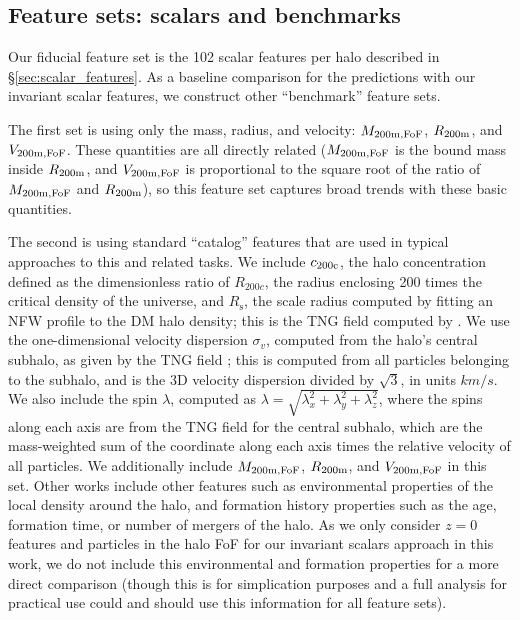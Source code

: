\subsection{Feature sets: scalars and benchmarks}
\label{sec:benchmarks}

Our fiducial feature set is the 102 scalar features per halo described in \S\ref{sec:scalar_features}.
As a baseline comparison for the predictions with our invariant scalar features, we construct other ``benchmark'' feature sets.

The first set is using only the mass, radius, and velocity: $M_\mathrm{200m,FoF}$, $R_\mathrm{200m}$, and $V_\mathrm{200m,FoF}$. 
These quantities are all directly related ($M_\mathrm{200m,FoF}$ is the bound mass inside $R_\mathrm{200m}$, and $V_\mathrm{200m,FoF}$ is proportional to the square root of the ratio of $M_\mathrm{200m,FoF}$ and $R_\mathrm{200m}$), so this feature set captures broad trends with these basic quantities.

The second is using standard ``catalog'' features that are used in typical approaches to this and related tasks.
We include $c_\mathrm{200c}$, the halo concentration defined as the dimensionless ratio of $R_{200c}$, the radius enclosing 200 times the critical density of the universe, and $R_\mathrm{s}$, the scale radius computed by fitting an NFW profile to the DM halo density; this is the TNG field  computed by \cite{anbajagane_baryonic_2021}.
We use the one-dimensional velocity dispersion $\sigma_{v}$, computed from the halo's central \dark subhalo, as given by the TNG field ; this is computed from all particles belonging to the subhalo, and is the 3D velocity dispersion divided by $\sqrt{3}$, in units $km/s$.
We also include the spin $\lambda$, computed as $\lambda = \sqrt{\lambda_x^2 + \lambda_y^2 + \lambda_z^2}$, where the spins along each axis are from the TNG field  for the central \dark subhalo, which are the mass-weighted sum of the coordinate along each axis times the relative velocity of all particles.
We additionally include $M_\mathrm{200m,FoF}$, $R_\mathrm{200m}$, and $V_\mathrm{200m,FoF}$ in this set.
Other works include other features such as environmental properties of the local density around the halo, and formation history properties such as the age, formation time, or number of mergers of the halo.
As we only consider $z=0$ features and particles in the halo FoF for our invariant scalars approach in this work, we do not include this environmental and formation properties for a more direct comparison (though this is for simplication purposes and a full analysis for practical use could and should use this information for all feature sets).

